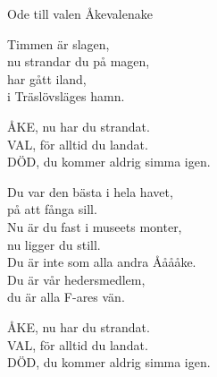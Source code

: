 \newpage

\begin{song}{Ode till valen Åke}{valenake}
\begin{vers}
Timmen är slagen,\\
nu strandar du på magen,\\
har gått iland,\\
i Träslövsläges hamn.\\
\end{vers}
\begin{vers}
ÅKE, nu har du strandat.\\
VAL, för alltid du landat.\\
DÖD, du kommer aldrig simma igen.\\
\end{vers}
\begin{vers}
Du var den bästa i hela havet,\\
på att fånga sill.\\
Nu är du fast i museets monter,\\
nu ligger du still.\\
Du är inte som alla andra Ååååke.\\
Du är vår hedersmedlem,\\
du är alla F-ares vän.\\
\end{vers}
\begin{vers}
ÅKE, nu har du strandat.\\
VAL, för alltid du landat.\\
DÖD, du kommer aldrig simma igen.\\
\end{vers}
\end{song}












